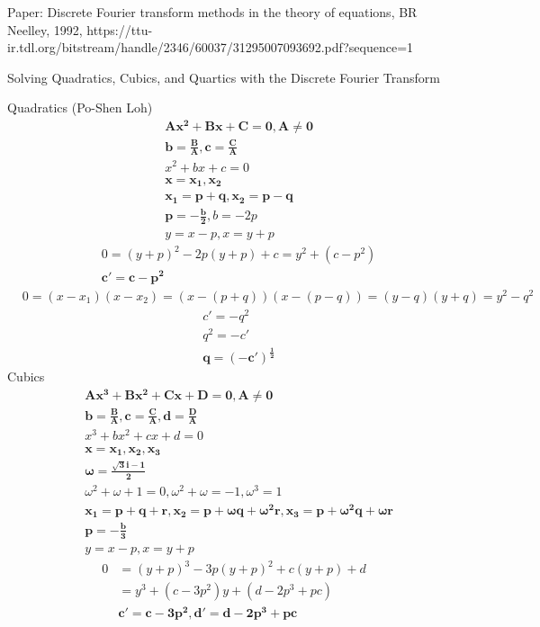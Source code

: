 \documentclass{article}
\begin{document}
Paper: Discrete Fourier transform methods in the theory of equations, BR Neelley, 1992, https://ttu-ir.tdl.org/bitstream/handle/2346/60037/31295007093692.pdf?sequence=1

Solving Quadratics, Cubics, and Quartics with the Discrete Fourier Transform

Quadratics (Po-Shen Loh)
\begin{align*}
  &\bm{Ax^2+Bx+C=0, A\neq0} \\
  &\bm{b=\frac{B}{A}, c=\frac{C}{A}} \\
  &x^2+bx+c=0 \\
  &\bm{x=x_1,x_2} \\
  &\bm{x_1=p+q, x_2=p-q} \\
  &\bm{p=-\frac{b}{2}}, b=-2p \\
  &y=x-p, x=y+p
\end{align*}
\begin{align*}
  &0=(y+p)^2-2p(y+p)+c=y^2+(c-p^2) \\
  &\bm{c'=c-p^2}
\end{align*}
\begin{align*}
  &0=(x-x_1)(x-x_2)=(x-(p+q))(x-(p-q))=(y-q)(y+q)=y^2-q^2
\end{align*}
\begin{align*}
  &c'=-q^2 \\
  &q^2=-c' \\
  &\bm{q=(-c')^\frac{1}{2}}
\end{align*}
\newpage
Cubics
\begin{align*}
  &\bm{Ax^3+Bx^2+Cx+D=0, A\neq0} \\
  &\bm{b=\frac{B}{A}, c=\frac{C}{A}, d=\frac{D}{A}} \\
  &x^3+bx^2+cx+d=0 \\
  &\bm{x=x_1,x_2,x_3} \\
  &\bm{\omega=\frac{\sqrt{3}i-1}{2}} \\
  &\omega^2+\omega+1=0, \omega^2+\omega=-1, \omega^3=1 \\
  &\bm{x_1=p+q+r, x_2=p+\omega q+\omega^2r, x_3=p+\omega^2q+\omega r} \\
  &\bm{p=-\frac{b}{3}} \\
  &y=x-p, x=y+p
\end{align*}
\begin{align*}
  0&=(y+p)^3-3p(y+p)^2+c(y+p)+d \\
  &=y^3+(c-3p^2)y+(d-2p^3+pc) \\
  &\bm{c'=c-3p^2, d'=d-2p^3+pc}
\end{align*}  
\end{document}
